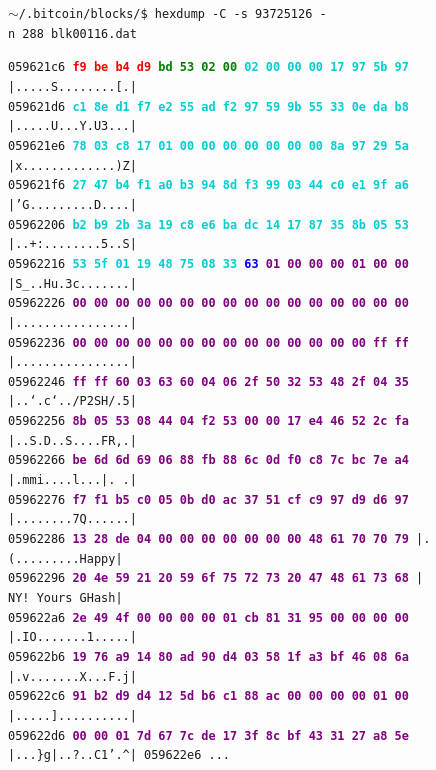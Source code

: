 \documentclass{article}
\begin{document}
    \begin{figure}[H]
    \scriptsize{\texttt{$\sim$/.bitcoin/blocks/\$ hexdump\ -C\ -s\ 93725126\ -n\ 288\ blk00116.dat}}
    
    \scriptsize{
    \texttt{059621c6  \textbf{\textcolor{red}{f9 be b4 d9} \textcolor{green}{bd 53 02 00}  \textcolor{darkTurquoise}{02 00 00 00 17 97 5b 97}}  |.....S........[.|} \\
    \texttt{059621d6  \textbf{\textcolor{darkTurquoise}{c1 8e d1 f7 e2 55 ad f2  97 59 9b 55 33 0e da b8}}  |.....U...Y.U3...|} \\
    \texttt{059621e6  \textbf{\textcolor{darkTurquoise}{78 03 c8 17 01 00 00 00  00 00 00 00 8a 97 29 5a}}  |x.............)Z|} \\
    \texttt{059621f6  \textbf{\textcolor{darkTurquoise}{27 47 b4 f1 a0 b3 94 8d  f3 99 03 44 c0 e1 9f a6}}  |'G.........D....|} \\
    \texttt{05962206  \textbf{\textcolor{darkTurquoise}{b2 b9 2b 3a 19 c8 e6 ba  dc 14 17 87 35 8b 05 53}}  |..+:........5..S|} \\
    \texttt{05962216  \textbf{\textcolor{darkTurquoise}{53 5f 01 19 48 75 08 33}  \textcolor{blue}{63} \textcolor{purple}{01 00 00 00 01 00 00}}  |S\_..Hu.3c.......|} \\
    \texttt{05962226  \textbf{\textcolor{purple}{00 00 00 00 00 00 00 00  00 00 00 00 00 00 00 00}}  |................|} \\
    \texttt{05962236  \textbf{\textcolor{purple}{00 00 00 00 00 00 00 00  00 00 00 00 00 00 ff ff}}  |................|} \\
    \texttt{05962246  \textbf{\textcolor{purple}{ff ff 60 03 63 60 04 06  2f 50 32 53 48 2f 04 35}}  |..`.c`../P2SH/.5|} \\
    \texttt{05962256  \textbf{\textcolor{purple}{8b 05 53 08 44 04 f2 53  00 00 17 e4 46 52 2c fa}}  |..S.D..S....FR,.|} \\
    \texttt{05962266  \textbf{\textcolor{purple}{be 6d 6d 69 06 88 fb 88  6c 0d f0 c8 7c bc 7e a4}}  |.mmi....l...|.~.|} \\
    \texttt{05962276  \textbf{\textcolor{purple}{f7 f1 b5 c0 05 0b d0 ac  37 51 cf c9 97 d9 d6 97}}  |........7Q......|} \\
    \texttt{05962286  \textbf{\textcolor{purple}{13 28 de 04 00 00 00 00  00 00 00 48 61 70 70 79}}  |.(.........Happy|} \\
    \texttt{05962296  \textbf{\textcolor{purple}{20 4e 59 21 20 59 6f 75  72 73 20 47 48 61 73 68}}  | NY! Yours GHash|} \\
    \texttt{059622a6  \textbf{\textcolor{purple}{2e 49 4f 00 00 00 00 01  cb 81 31 95 00 00 00 00}}  |.IO.......1.....|} \\
    \texttt{059622b6  \textbf{\textcolor{purple}{19 76 a9 14 80 ad 90 d4  03 58 1f a3 bf 46 08 6a}}  |.v.......X...F.j|} \\
    \texttt{059622c6  \textbf{\textcolor{purple}{91 b2 d9 d4 12 5d b6 c1  88 ac 00 00 00 00 01 00}}  |.....]..........|} \\
    \texttt{059622d6  \textbf{\textcolor{purple}{00 00 01 7d 67 7c de 17  3f 8c bf 43 31 27 a8 5e}}  |...\}g|..?..C1'.\textasciicircum|
    \texttt{059622e6} ...}
    }
    \end{figure}
\end{document}

